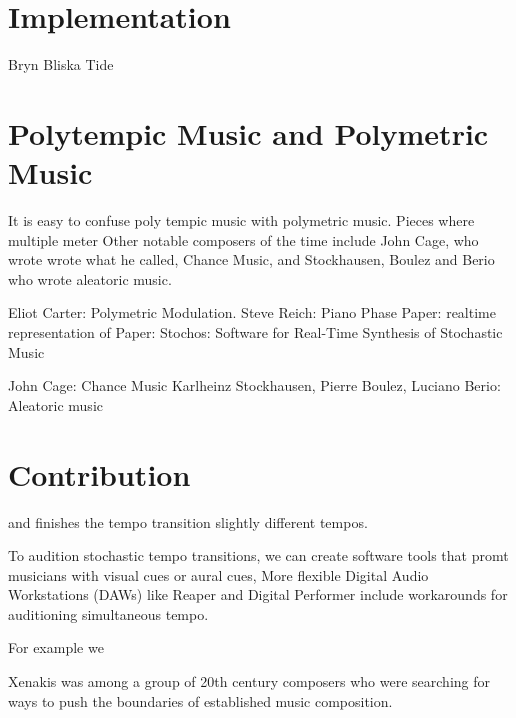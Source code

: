 \section{Implementation}
\label{sec:polytempic-implementation}

Bryn Bliska Tide

\section{Polytempic Music and Polymetric Music}
\label{sec:polytempic-vs-polymetric}
It is easy to confuse poly tempic music with polymetric music.  Pieces
where multiple meter
Other notable composers
of the time include John Cage, who wrote wrote what he called, Chance
Music, and Stockhausen, Boulez and Berio who wrote aleatoric music.



Eliot Carter: Polymetric Modulation. 
Steve Reich: Piano Phase
Paper: realtime representation of 
Paper: Stochos: Software for Real-Time Synthesis of Stochastic Music

John Cage: Chance Music
Karlheinz Stockhausen, Pierre Boulez, Luciano Berio: Aleatoric music

\section{Contribution}
\label{sec:polytempic-contribution}

and finishes the tempo transition slightly different tempos.

To audition stochastic tempo transitions, we can create software tools
that promt musicians with visual cues or aural cues, 
More flexible Digital Audio Workstations (DAWs) like Reaper and
Digital Performer include workarounds for auditioning simultaneous
tempo. 

For example we 

Xenakis was among a group of
20th century composers who were searching for ways to push the
boundaries of established music composition.


